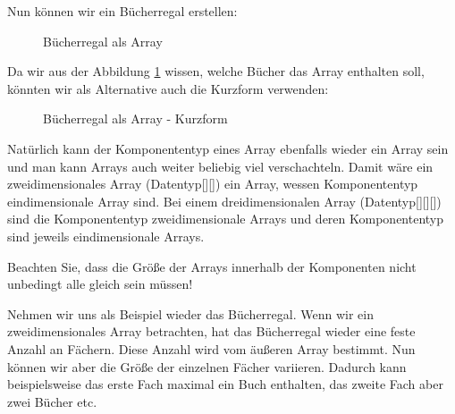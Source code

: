 \documentclass{tuda-pub}
\begin{document}
  Nun können wir ein Bücherregal erstellen:

  \begin{figure}[h]
    \centering
    
    \caption{Bücherregal als Array}
    \label{fig:Book_Array}
  \end{figure}

  \clearpage

  Da wir aus der Abbildung \ref{fig:Book_Array} wissen, welche Bücher das Array enthalten soll,
  könnten wir als Alternative auch die Kurzform verwenden:

  \begin{figure}[h]
    \centering
    
    \caption{Bücherregal als Array - Kurzform}
  \end{figure}


  Natürlich kann der Komponententyp eines Array ebenfalls wieder ein Array sein und man kann
  Arrays auch weiter beliebig viel verschachteln. Damit wäre ein zweidimensionales Array
  (Datentyp[][]) ein Array, wessen Komponententyp eindimensionale Array sind. Bei einem
  dreidimensionalen Array (Datentyp[][][]) sind die Komponententyp zweidimensionale Arrays und
  deren Komponententyp sind jeweils eindimensionale Arrays.

  \begin{note}[title=Information:]
    Beachten Sie, dass die Größe der Arrays innerhalb der Komponenten nicht unbedingt alle gleich
    sein müssen!
  \end{note}

  \br

  Nehmen wir uns als Beispiel wieder das Bücherregal. Wenn wir ein zweidimensionales Array
  betrachten, hat das Bücherregal wieder eine feste Anzahl an Fächern. Diese Anzahl wird vom
  äußeren Array bestimmt. Nun können wir aber die Größe der einzelnen Fächer variieren. Dadurch
  kann beispielsweise das erste Fach maximal ein Buch enthalten, das zweite Fach aber zwei Bücher
  etc.
\end{document}
